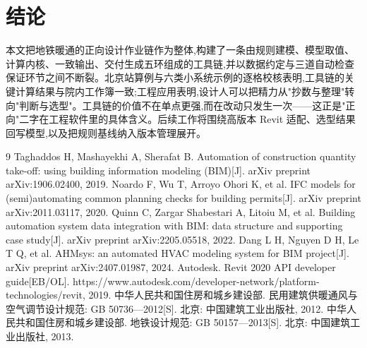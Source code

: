 \documentclass[UTF8,a4paper,zihao=-4]{ctexart}
\begin{document}
\section{结论}

本文把地铁暖通的正向设计作业链作为整体,构建了一条由规则建模、模型取值、计算内核、一致输出、交付生成五环组成的工具链,并以数据约定与三道自动检查保证环节之间不断裂。北京站算例与六类小系统示例的逐格校核表明,工具链的关键计算结果与院内工作簿一致;工程应用表明,设计人可以把精力从"抄数与整理"转向"判断与选型"。工具链的价值不在单点更强,而在改动只发生一次——这正是"正向"二字在工程软件里的具体含义。后续工作将围绕高版本 Revit 适配、选型结果回写模型,以及把规则基线纳入版本管理展开。

\begin{thebibliography}{9}
 Taghaddos H, Mashayekhi A, Sherafat B. Automation of construction quantity take-off: using building information modeling (BIM)[J]. arXiv preprint arXiv:1906.02400, 2019.
 Noardo F, Wu T, Arroyo Ohori K, et al. IFC models for (semi)automating common planning checks for building permits[J]. arXiv preprint arXiv:2011.03117, 2020.
 Quinn C, Zargar Shabestari A, Litoiu M, et al. Building automation system data integration with BIM: data structure and supporting case study[J]. arXiv preprint arXiv:2205.05518, 2022.
 Dang L H, Nguyen D H, Le T Q, et al. AHMsys: an automated HVAC modeling system for BIM project[J]. arXiv preprint arXiv:2407.01987, 2024.
 Autodesk. Revit 2020 API developer guide[EB/OL]. https://www.autodesk.com/developer-network/platform-technologies/revit, 2019.
 中华人民共和国住房和城乡建设部. 民用建筑供暖通风与空气调节设计规范: GB 50736—2012[S]. 北京: 中国建筑工业出版社, 2012.
 中华人民共和国住房和城乡建设部. 地铁设计规范: GB 50157—2013[S]. 北京: 中国建筑工业出版社, 2013.
\end{thebibliography}
\end{document}
